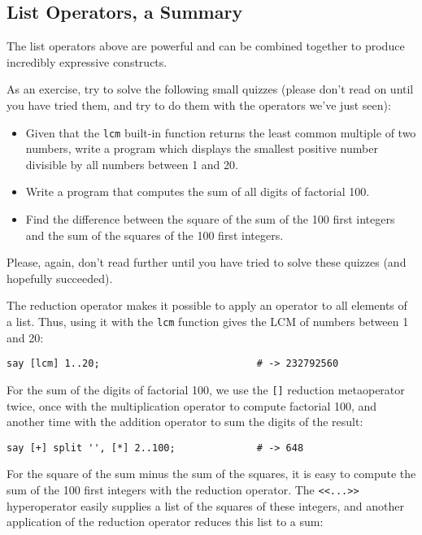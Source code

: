 \subsection{List Operators, a Summary}

The list operators above are powerful 
and can be combined together to produce incredibly 
expressive constructs.

As an exercise, try to solve the following small 
quizzes (please don't read on until you have tried 
them, and try to do them with the operators we've 
just seen):

\begin{itemize}
\item Given that the {\tt lcm} built-in function 
returns the least common multiple of two numbers, 
write a program which displays the smallest positive 
number divisible by all numbers between 1 and 20.

\item Write a program that computes the sum of all 
digits of factorial 100.

\item Find the difference between the square of the sum 
of the 100 first integers and the sum of the squares of 
the 100 first integers.
\end{itemize}

Please, again, don't read further until you have tried 
to solve these quizzes (and hopefully succeeded).

The reduction operator makes it possible to apply an 
operator to all elements of a list. Thus, using it 
with the {\tt lcm} function gives the LCM of numbers 
between 1 and 20:

\begin{verbatim}
say [lcm] 1..20;                           # -> 232792560
\end{verbatim}

For the sum of the digits of factorial 100, we use 
the \verb'[]' reduction metaoperator twice, once with 
the multiplication operator to compute factorial 100, 
and another time with the addition operator to sum 
the digits of the result:

\begin{verbatim}
say [+] split '', [*] 2..100;              # -> 648
\end{verbatim}

For the square of the sum minus the sum of the squares, 
it is easy to compute the sum of the 100 first integers 
with the reduction operator. The \verb'<<...>>' 
hyperoperator easily supplies a list of the squares of 
these integers, and another application of the reduction 
operator reduces this list to a sum:

